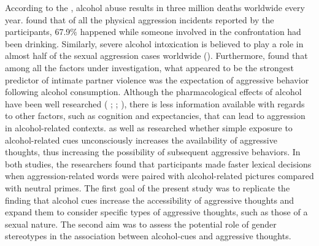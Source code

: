 \documentclass[serif, authordate, twocolumn, empirical]{jote-article}
\begin{document}
According to the \textcite{Organization}, alcohol abuse results in three million deaths worldwide every year. \textcite{WellsGrahamWest2000} found that of all the physical aggression incidents reported by the participants, 67.9$\%$  happened while someone involved in the confrontation had been drinking. Similarly, severe alcohol intoxication is believed to play a role in almost half of the sexual aggression cases worldwide (\cite{Testa2002}). Furthermore, \textcite{FieldCaetanoNelson2004} found that among all the factors under investigation, what appeared to be the strongest predictor of intimate partner violence was the expectation of aggressive behavior following alcohol consumption. Although the pharmacological effects of alcohol have been well researched ( ; \cite{Giancola2000}; \cite{HeinzBeckMeyerLindenbergSterzerHeinz2011}), there is less information available with regards to other factors, such as cognition and expectancies, that can lead to aggression in alcohol-related contexts. \textcite{BartholowHeinz2006} as well as \textcite{SubraMullerBegueLBushmanDelmas2010} researched whether simple exposure to alcohol-related cues unconsciously increases the availability of aggressive thoughts, thus increasing the possibility of subsequent aggressive behaviors. In both studies, the researchers found that participants made faster lexical decisions when aggression-related words were paired with alcohol-related pictures compared with neutral primes. The first goal of the present study was to replicate the finding that alcohol cues increase the accessibility of aggressive thoughts and expand them to consider specific types of aggressive thoughts, such as those of a sexual nature. The second aim was to assess the potential role of gender stereotypes in the association between alcohol-cues and aggressive thoughts.
\end{document}

